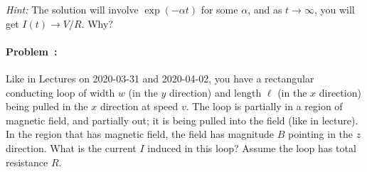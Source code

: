 \documentclass[12pt]{article}
\begin{document}
\textsl{Hint:} The solution will involve $\exp(-\alpha t)$ for some
$\alpha$, and as $t\rightarrow\infty$, you will get $I(t)\rightarrow
V/R$. Why?

\paragraph{Problem~\theproblem:}%
Like in Lectures on 2020-03-31 and 2020-04-02, you have a rectangular
conducting loop of width $w$ (in the $y$ direction) and length $\ell$
(in the $x$ direction) being pulled in the $x$ direction at speed
$v$. The loop is partially in a region of magnetic field, and
partially out; it is being pulled into the field (like in lecture). In
the region that has magnetic field, the field has magnitude $B$
pointing in the $z$ direction. What is the current $I$ induced in this
loop? Assume the loop has total resistance $R$.
\end{document}
